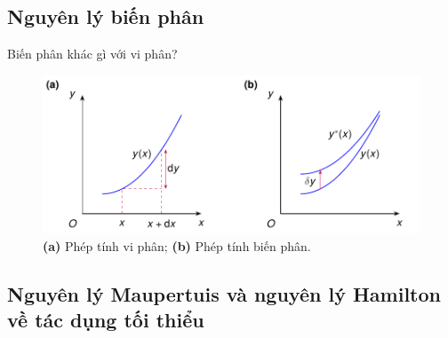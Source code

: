 \subsection{Nguyên lý biến phân}

\begin{frame}{Biến phân khác gì với vi phân?}
    \vspace{-4mm}
    \begin{figure}
        \centering
        \includegraphics[width=\linewidth]{Figures/Variations.pdf}
        \caption{\textbf{(a)} Phép tính vi phân; \textbf{(b)} Phép tính biến phân. \cite{dao2002cohocgiaitich}}
        \label{fig:Variations}
    \end{figure}
\end{frame}


\subsection{Nguyên lý Maupertuis và nguyên lý Hamilton
về tác dụng tối thiểu}

